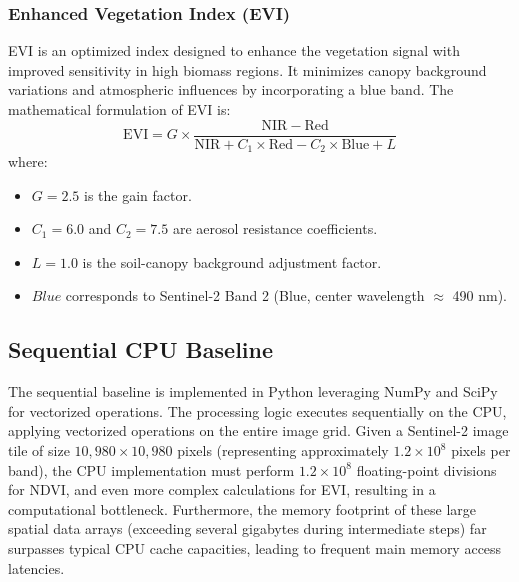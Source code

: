 \documentclass[10pt,conference,compsoc]{IEEEtran}
\begin{document}
\subsubsection{Enhanced Vegetation Index (EVI)}
EVI is an optimized index designed to enhance the vegetation signal with improved sensitivity in high biomass regions. It minimizes canopy background variations and atmospheric influences by incorporating a blue band. The mathematical formulation of EVI is:
\begin{equation}
\mathrm{EVI} = G \times \frac{\mathrm{NIR} - \mathrm{Red}}{\mathrm{NIR} + C_1 \times \mathrm{Red} - C_2 \times \mathrm{Blue} + L}
\label{eq:evi}
\end{equation}
where:
\begin{itemize}
    \item $G = 2.5$ is the gain factor.
    \item $C_1 = 6.0$ and $C_2 = 7.5$ are aerosol resistance coefficients.
    \item $L = 1.0$ is the soil-canopy background adjustment factor.
    \item $Blue$ corresponds to Sentinel-2 Band 2 (Blue, center wavelength $\approx$ 490 nm).
\end{itemize}

\subsection{Sequential CPU Baseline}
The sequential baseline is implemented in Python leveraging NumPy and SciPy for vectorized operations. The processing logic executes sequentially on the CPU, applying vectorized operations on the entire image grid. Given a Sentinel-2 image tile of size $10,980 \times 10,980$ pixels (representing approximately $1.2 \times 10^8$ pixels per band), the CPU implementation must perform $1.2 \times 10^8$ floating-point divisions for NDVI, and even more complex calculations for EVI, resulting in a computational bottleneck. Furthermore, the memory footprint of these large spatial data arrays (exceeding several gigabytes during intermediate steps) far surpasses typical CPU cache capacities, leading to frequent main memory access latencies.
\end{document}

